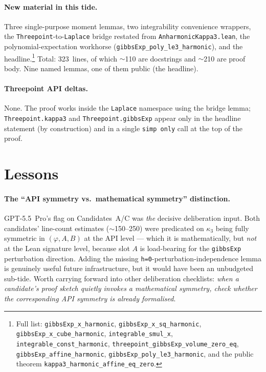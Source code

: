 \documentclass[11pt]{article}
\begin{document}
\paragraph{New material in this tide.}
Three single-purpose moment lemmas, two integrability convenience
wrappers, the
\texttt{Threepoint}-to-\texttt{Laplace} bridge restated from
\texttt{AnharmonicKappa3.lean}, the
polynomial-expectation workhorse
(\texttt{gibbsExp\_poly\_le3\_harmonic}), and the
headline.\footnote{Full
list: \texttt{gibbsExp\_x\_harmonic},
\texttt{gibbsExp\_x\_sq\_harmonic},
\texttt{gibbsExp\_x\_cube\_harmonic},
\texttt{integrable\_smul\_x},
\texttt{integrable\_const\_harmonic},
\texttt{threepoint\_gibbsExp\_volume\_zero\_eq},
\texttt{gibbsExp\_affine\_harmonic},
\texttt{gibbsExp\_poly\_le3\_harmonic}, and
the public theorem
\texttt{kappa3\_harmonic\_affine\_eq\_zero}.} Total: 323~lines, of
which $\sim$110 are docstrings and $\sim$210 are proof body. Nine
named lemmas, one of them public (the headline).

\paragraph{Threepoint API deltas.}
None. The proof works inside the \texttt{Laplace} namespace using
the bridge lemma; \texttt{Threepoint.kappa3} and
\texttt{Threepoint.gibbsExp} appear only in the headline statement
(by construction) and in a single \texttt{simp only} call at the top
of the proof.

\section{Lessons}

\paragraph{The ``API symmetry vs.\ mathematical symmetry'' distinction.}
GPT-5.5~Pro's flag on Candidates~A/C was \emph{the} decisive
deliberation input. Both candidates' line-count estimates
($\sim$150--250) were predicated on $\kappa_3$ being fully symmetric
in $(\varphi, A, B)$ at the API level — which it is mathematically,
but \emph{not} at the Lean signature level, because slot $A$ is
load-bearing for the \texttt{gibbsExp} perturbation direction. Adding
the missing \texttt{h=0}-perturbation-independence lemma is genuinely
useful future infrastructure, but it would have been an unbudgeted
sub-tide. Worth carrying forward into other deliberation
checklists: \emph{when a candidate's proof sketch quietly invokes a
mathematical symmetry, check whether the corresponding API symmetry
is already formalised}.
\end{document}
